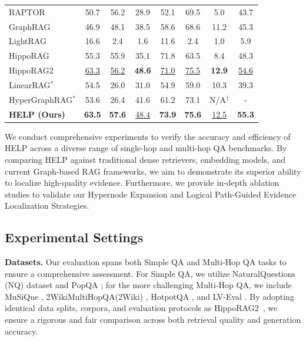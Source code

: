 \begin{table}[t!]
\begin{tabular}{l cccccc c}
        RAPTOR \cite{sarthi2024raptor} & 50.7 & 56.2 & 28.9 & 52.1 & 69.5 & 5.0 & 43.7  \\
        GraphRAG \cite{edge2024local} & 46.9 & 48.1 & 38.5 & 58.6 & 68.6 & 11.2 & 45.3 \\
        LightRAG \cite{guo2024lightrag} & 16.6 & 2.4 & 1.6 & 11.6 & 2.4 & 1.0 & 5.9 \\
        HippoRAG \cite{jimenez2024hipporag} & 55.3 & 55.9 & 35.1 & 71.8 & 63.5 & 8.4 & 48.3 \\
        HippoRAG2 \cite{gutierrez2025rag} & \underline{63.3} & \underline{56.2} & \textbf{48.6} & \underline{71.0} & \underline{75.5} & \textbf{12.9} & \underline{54.6} \\
        LinearRAG$^*$ \cite{zhuang2025linearrag} & 54.5 & 26.0 & 31.0 & 54.9 & 59.0 & 10.3 & 39.3 \\
        HyperGraphRAG$^*$ \cite{luo2025hypergraphrag} & 53.6 & 26.4 & 41.6 & 61.2 & 73.1 & N/A$^\dagger$ & - \\
        \midrule
        \rowcolor{blue!10} \textbf{HELP (Ours)} & \textbf{63.5} & \textbf{57.6} & \underline{48.4} & \textbf{73.9} & \textbf{75.6} & \underline{12.5} & \textbf{55.3} \\
        \bottomrule
    \end{tabular}
\vspace{-5pt}
\end{table}

We conduct comprehensive experiments to verify the accuracy and efficiency of HELP across a diverse range of single-hop and multi-hop QA benchmarks. By comparing HELP against traditional dense retrievers, embedding models, and current Graph-based RAG frameworks, we aim to demonstrate its superior ability to localize high-quality evidence. Furthermore, we provide in-depth ablation studies to validate our Hypernode Expansion and Logical Path-Guided Evidence Localization Strategies.
\subsection{Experimental Settings}

\textbf{Datasets.} 
Our evaluation spans both Simple QA and Multi-Hop QA tasks to ensure a comprehensive assessment. For Simple QA, we utilize NaturalQuestions (NQ) dataset \cite{wang2024rear} and PopQA \cite{mallen-etal-2023-trust}; for the more challenging Multi-Hop QA, we include MuSiQue \cite{trivedi-etal-2022-musique}, 2WikiMultiHopQA(2Wiki) \cite{ho2020constructing}, HotpotQA \cite{yang2018hotpotqa}, and LV-Eval \cite{yuan2024lv}. By adopting identical data splits, corpora, and evaluation protocols as HippoRAG2~\cite{gutierrez2025rag}, we ensure a rigorous and fair comparison across both retrieval quality and generation accuracy.

